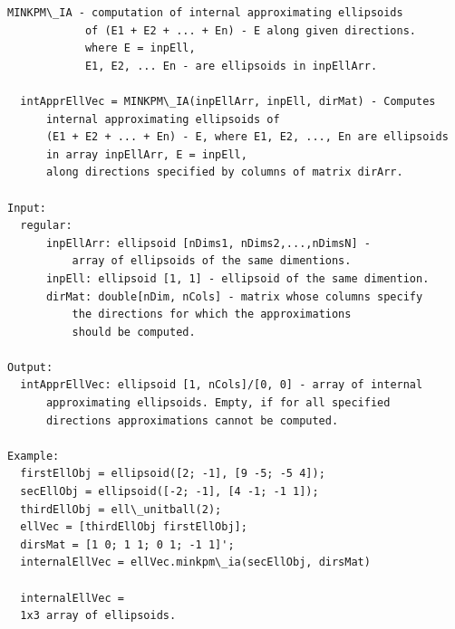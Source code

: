 \documentclass[letterpaper,10pt,english]{sphinxmanual}
\begin{document}
\begin{Verbatim}[commandchars=\\\{\}]
MINKPM\_IA - computation of internal approximating ellipsoids
            of (E1 + E2 + ... + En) - E along given directions.
            where E = inpEll,
            E1, E2, ... En - are ellipsoids in inpEllArr.

  intApprEllVec = MINKPM\_IA(inpEllArr, inpEll, dirMat) - Computes
      internal approximating ellipsoids of
      (E1 + E2 + ... + En) - E, where E1, E2, ..., En are ellipsoids
      in array inpEllArr, E = inpEll,
      along directions specified by columns of matrix dirArr.

Input:
  regular:
      inpEllArr: ellipsoid [nDims1, nDims2,...,nDimsN] -
          array of ellipsoids of the same dimentions.
      inpEll: ellipsoid [1, 1] - ellipsoid of the same dimention.
      dirMat: double[nDim, nCols] - matrix whose columns specify
          the directions for which the approximations
          should be computed.

Output:
  intApprEllVec: ellipsoid [1, nCols]/[0, 0] - array of internal
      approximating ellipsoids. Empty, if for all specified
      directions approximations cannot be computed.

Example:
  firstEllObj = ellipsoid([2; -1], [9 -5; -5 4]);
  secEllObj = ellipsoid([-2; -1], [4 -1; -1 1]);
  thirdEllObj = ell\_unitball(2);
  ellVec = [thirdEllObj firstEllObj];
  dirsMat = [1 0; 1 1; 0 1; -1 1]';
  internalEllVec = ellVec.minkpm\_ia(secEllObj, dirsMat)

  internalEllVec =
  1x3 array of ellipsoids.
\end{Verbatim}
\end{document}
